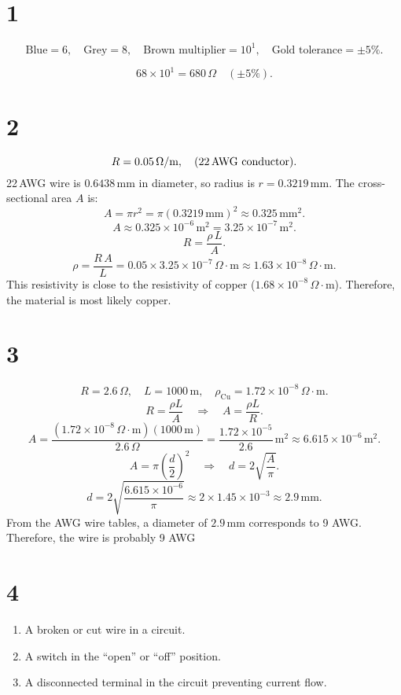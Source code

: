 \documentclass[10pt]{article}
\begin{document}
\section*{1}
\[
	\text{Blue} = 6,\quad
	\text{Grey} = 8,\quad
	\text{Brown multiplier} = 10^1,\quad
	\text{Gold tolerance} = \pm 5\%.
\]

\[
	68 \times 10^1 = 680 \,\Omega \quad (\pm 5\%).
\]

\section*{2}


\[
	R = 0.05 \,\Omega/\text{m}, \quad
	\text{(22\,AWG conductor)}.
\]
22\,AWG wire is $0.6438\,\text{mm}$ in diameter, so radius is $r = 0.3219\,\text{mm}$. The cross-sectional area $A$ is:
\[
	A = \pi r^2 = \pi (0.3219\,\text{mm})^2
	\approx 0.325\,\text{mm}^2.
\]
\[
	A \approx 0.325 \times 10^{-6}\,\text{m}^2 = 3.25 \times 10^{-7}\,\text{m}^2.
\]
\[
	R = \frac{\rho \, L}{A}.
\]
\[
	\rho = \frac{R \, A}{L} = 0.05 \times 3.25 \times 10^{-7} \,\Omega \cdot \text{m}
	\approx 1.63 \times 10^{-8}\,\Omega\cdot\text{m}.
\]
This resistivity is  close to the resistivity of copper ($ 1.68 \times 10^{-8}\,\Omega\cdot\text{m}$). Therefore, the material is most likely copper.

\section*{3}

\[
	R = 2.6\,\Omega, \quad L = 1000\,\text{m}, \quad
	\rho_{\text{Cu}} = 1.72 \times 10^{-8}\,\Omega \cdot \text{m}.
\]
\[
	R = \frac{\rho L}{A}
	\quad \Longrightarrow \quad
	A = \frac{\rho L}{R}.
\]
\[
	A = \frac{(1.72 \times 10^{-8}\,\Omega\cdot\text{m})(1000\,\text{m})}{2.6\,\Omega}
	= \frac{1.72 \times 10^{-5}}{2.6}\,\text{m}^2
	\approx 6.615 \times 10^{-6}\,\text{m}^2.
\]
\[
	A = \pi \left(\frac{d}{2}\right)^2
	\quad \Longrightarrow \quad
	d = 2 \sqrt{\frac{A}{\pi}}.
\]
\[
	d = 2 \sqrt{\frac{6.615 \times 10^{-6}}{\pi}}
	\approx 2 \times 1.45 \times 10^{-3}
	\approx 2.9 \,\text{mm}.
\]
From the AWG wire tables, a diameter of  $2.9\,\text{mm}$ corresponds to 9 AWG. Therefore, the wire is probably 9 AWG

\section*{4}

\begin{enumerate}
	\item A broken or cut wire in a circuit.
	\item A switch in the ``open'' or ``off'' position.
	\item A disconnected terminal in the circuit preventing current flow.
\end{enumerate}
\end{document}
